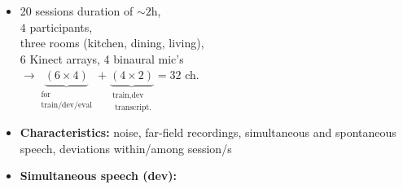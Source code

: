 \documentclass{beamer}
\newcommand{\transparency}{0.9}  %
\begin{document}
\begin{frame}
{\begin{minipage}[t]{0.44\textwidth}
  \begin{itemize}
    \item 20 sessions duration of $\sim2$h, \\ 
    $4$ participants, \\
    three rooms (kitchen, dining, living),  \\
    6 Kinect arrays, 4 binaural mic's \\ 
    $\rightarrow \underbrace{(6 \times 4)}_{\substack{\text{for} \\ \text{train/dev/eval}}} + \underbrace{(4 \times 2)}_{\substack{\text{train,dev} \\ \text{ transcript.}}} = 32$ ch.
    \item \textbf{Characteristics:} \textcolor{tug_red}{noise}, \textcolor{tug_red}{far-field recordings}, \textcolor{tug_red}{simultaneous and spontaneous speech}, \textcolor{tug_red}{deviations within/among session/s} 
    \item \textbf{Simultaneous speech (dev):}
  \end{itemize}
  \vspace{-1em}
  \begin{figure}
    \centering
  \end{figure}
 
  \end{minipage}  
  \hspace{-.75em}
  }    
  
\end{frame}
\end{document}
